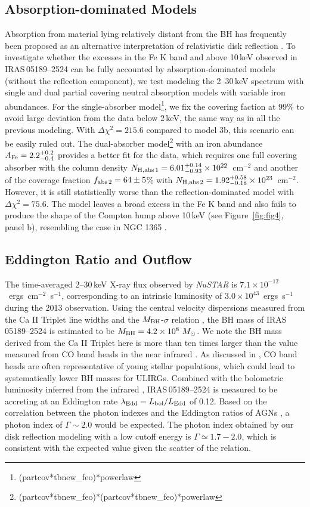 \documentclass[]{emulateapj}
\def \nustar {{\em NuSTAR }}
\def \iras {{IRAS\,05189--2524 }}
\newcommand{\Msun}      {\mbox{$M_{\mathord\odot}$}}
\begin{document}
\subsection{Absorption-dominated Models}
Absorption from material lying relatively distant from the BH has frequently been proposed as an alternative interpretation of relativistic disk reflection \citep[e.g.,][]{mil08,mil09}. To investigate whether the excesses in the Fe K band and above 10\,keV observed in \iras can be fully accounted by absorption-dominated models (without the reflection component), we test modeling the 2--30\,keV spectrum with single and dual partial covering neutral absorption models with variable iron abundances. For the single-absorber model\footnote{(partcov*tbnew\_feo)*powerlaw}, we fix the covering faction at 99\% to avoid large deviation from the data below 2\,keV, the same way as in all the previous modeling. With $\Delta \chi^{2} = 215.6$ compared to model 3b, this scenario can be easily ruled out. The dual-absorber model\footnote{(partcov*tbnew\_feo)*(partcov*tbnew\_feo)*powerlaw} with an iron abundance $A_{\rm Fe}=2.2^{+0.2}_{-0.4}$ provides a better fit for the data, which requires one full covering absorber with the column density $N_{\rm H,abs\,1}=6.01^{+0.14}_{-0.93}\times10^{22}$~cm$^{-2}$ and another of the coverage fraction $f_{\rm abs\,2}=64\pm5$\% with $N_{\rm H,abs\,2}=1.92^{+0.58}_{-0.18}\times10^{23}$~cm$^{-2}$. However, it is still statistically worse than the reflection-dominated model with $\Delta \chi^{2}=75.6$. The model leaves a broad excess in the Fe K band and also fails to produce the shape of the Compton hump above 10\,keV (see Figure~\ref{fig:fig4}, panel b), resembling the case in NGC 1365 \citep{ris13} .

\subsection{Eddington Ratio and Outflow} 
The time-averaged 2--30\,keV X-ray flux observed by \nustar is $7.1 \times 10^{-12}$~ergs~cm$^{-2}$~s$^{-1}$, corresponding to an intrinsic luminosity of $3.0 \times 10^{43}$~ergs~s$^{-1}$ during the 2013 observation. Using the central velocity dispersions measured from the Ca {\footnotesize II} Triplet line widths \citep{rot13} and the $M_{\rm BH}$-$\sigma$ relation \citep{tre02}, the BH mass of \iras is estimated to be $M_{\rm BH}=4.2 \times10^{8}~\Msun$. We note the BH mass derived from the Ca {\footnotesize II} Triplet here is more than ten times larger than the value measured from CO band heads in the near infrared \citep{das06}. As discussed in \cite{das06}, CO band heads are often representative of young stellar populations, which could lead to systematically lower BH masses for ULIRGs. Combined with the bolometric luminosity inferred from the infrared \citep{ten15}, \iras is measured to be accreting at an Eddington rate $\lambda_{\rm Edd}=L_{\rm bol}/L_{\rm Edd}$ of 0.12. Based on the correlation between the photon indexes and the Eddington ratios of AGNs \citep{she08,bri13,bri16}, a photon index of $\Gamma \sim 2.0$ would be expected. The photon index obtained by our disk reflection modeling with a low cutoff energy is $\Gamma \simeq1.7-2.0$, which is consistent with the expected value given the scatter of the relation.
\end{document}
